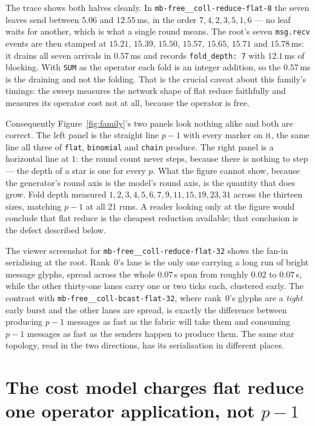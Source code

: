 \documentclass[11pt]{article}
\begin{document}
The trace shows both halves cleanly. In \texttt{mb-free\_\_coll-reduce-flat-8} the seven leaves
send between $5.06$ and $12.55$\,ms, in the order $7, 4, 2, 3, 5, 1, 6$ --- no leaf waits for
another, which is what a single round means. The root's seven \texttt{msg.recv} events are then
stamped at $15.21$, $15.39$, $15.50$, $15.57$, $15.65$, $15.71$ and $15.78$\,ms: it drains all
seven arrivals in $0.57$\,ms and records \texttt{fold\_depth: 7} with $12.1$\,ms of blocking.
With \texttt{SUM} as the operator each fold is an integer addition, so the $0.57$\,ms is the
draining and not the folding. That is the crucial caveat about this family's timings: the
sweep measures the network shape of flat reduce faithfully and measures its operator cost not
at all, because the operator is free.

Consequently Figure~\ref{fig:family}'s two panels look nothing alike and both are correct. The
left panel is the straight line $p-1$ with every marker on it, the same line all three of
\texttt{flat}, \texttt{binomial} and \texttt{chain} produce. The right panel is a horizontal
line at $1$: the round count never steps, because there is nothing to step --- the depth of a
star is one for every $p$. What the figure cannot show, because the generator's round axis is
the model's round axis, is the quantity that does grow. Fold depth measured $1, 2, 3, 4, 5, 6,
7, 9, 11, 15, 19, 23, 31$ across the thirteen sizes, matching $p-1$ at all 21 runs. A reader
looking only at the figure would conclude that flat reduce is the cheapest reduction available;
that conclusion is the defect described below.

The viewer screenshot for \texttt{mb-free\_\_coll-reduce-flat-32} shows the fan-in serialising
at the root. Rank~0's lane is the only one carrying a long run of bright message glyphs, spread
across the whole $0.07$\,s span from roughly $0.02$ to $0.07$\,s, while the other thirty-one
lanes carry one or two ticks each, clustered early. The contrast with
\texttt{mb-free\_\_coll-bcast-flat-32}, where rank~0's glyphs are a \emph{tight} early burst
and the other lanes are spread, is exactly the difference between producing $p-1$ messages as
fast as the fabric will take them and consuming $p-1$ messages as fast as the senders happen to
produce them. The same star topology, read in the two directions, has its serialisation in
different places.

\section{The cost model charges flat reduce one operator application, not \texorpdfstring{$p-1$}{p-1}}
\end{document}
